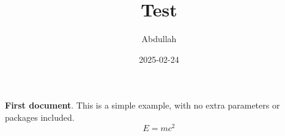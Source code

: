 \documentclass[20pt,a4paper]{article}
\title{Test}
\author{Abdullah}
\date{2025-02-24}
\begin{document}
\maketitle
\textbf {First document}.
This is a simple example, with no 
extra parameters or packages included.
\begin{equation}
  E=mc^2
\end{equation}



\end{document}

